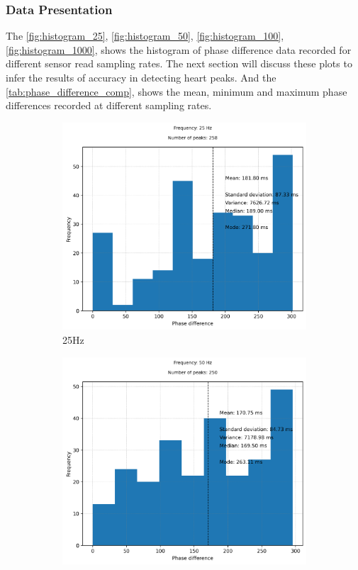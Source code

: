 \subsubsection{Data Presentation}
The \autoref{fig:histogram_25}, \autoref{fig:histogram_50}, \autoref{fig:histogram_100}, \autoref{fig:histogram_1000}, shows the histogram of phase difference data recorded for different sensor read sampling rates. The next section will discuss these plots to infer the results of accuracy in detecting heart peaks. And the \autoref{tab:phase_difference_comp}, shows the mean, minimum and maximum phase differences recorded at different sampling rates.

\begin{figure}[H]
    \begin{subfigure}{0.5\linewidth}
        \centering
        \includegraphics[width=\linewidth]{chapters/Results/histogram_25.png}
        \caption{25Hz}
        \label{fig:histogram_25}
    \end{subfigure}
    \begin{subfigure}{0.5\linewidth}
        \centering
        \includegraphics[width=\linewidth]{chapters/Results/histogram_50.png}

\end{subfigure}
\end{figure}
